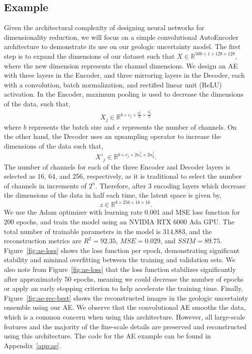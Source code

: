 \documentclass[a4paper,fleqn,12pt]{article}
\begin{document}
\subsection*{Example}
Given the architectural complexity of designing neural networks for dimensionality reduction, we will focus on a simple convolutional AutoEncoder architecture to demonstrate its use on our geologic uncertainty model. The first step is to expand the dimensions of our dataset such that $X\in\mathbb{R}^{500\times1\times128\times128}$, where the new dimension represents the channel dimensions. We design an AE with three layers in the Encoder, and three mirroring layers in the Decoder, each with a convolution, batch normalization, and rectified linear unit (ReLU) activation. In the Encoder, maximum pooling is used to decrease the dimensions of the data, such that,
\begin{equation}
    X_{j}\in\mathbb{R}^{b\times c_j \times \frac{n_x^j}{2} \times \frac{n_y^j}{2}}    
\end{equation}
where $b$ represents the batch size and $c$ represents the number of channels. On the other hand, the Decoder uses an upsampling operator to increase the dimensions of the data such that,
\begin{equation}
    X'_j\in\mathbb{R}^{b \times c_j \times 2n_x^j \times 2n_y^j} .
\end{equation}
The number of channels for each of the three Encoder and Decoder layers is selected as 16, 64, and 256, respectively, as it is traditional to select the number of channels in increments of $2^n$. Therefore, after 3 encoding layers which decrease the dimensions of the data in half each time, the latent space is given by,
\begin{equation}
    z\in\mathbb{R}^{b\times 256\times16\times16} .    
\end{equation}
We use the Adam optimizer \cite{kingma2014adam} with learning rate 0.001 and MSE loss function for 200 epochs, and train the model using an NVIDIA RTX 6000 Ada GPU. The total number of trainable parameters in the model is 314,883, and the reconstruction metrics are $R^2=92.35$, $MSE=0.029$, and $SSIM=89.75$. Figure~\ref{fig:ae-loss} shows the loss function per epoch, demonstrating significant stability and minimal overfitting between the training and validation sets. We also note from Figure~\ref{fig:ae-loss} that the loss function stabilizes significantly after approximately 50 epochs, meaning we could decrease the number of epochs or apply an early stopping criterion to help accelerate the training time. Finally, Figure~\ref{fig:ae-rec-best} shows the reconstructed images in the geologic uncertainty ensemble using our AE. We observe that the convolutional AE smooths the data, which is a common concern when using this architecture. However, all large-scale features and the majority of the fine-scale details are preserved and reconstructed using this architecture. The code for the AE example can be found in Appendix~\ref{app:ae}.
\end{document}
